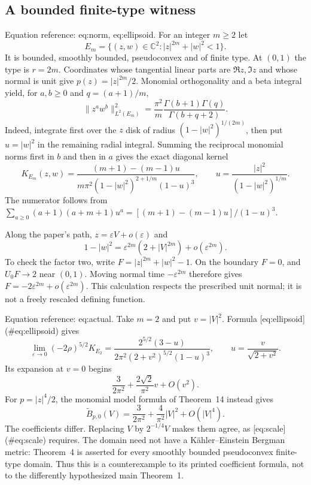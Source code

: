 \documentclass[10pt]{article}
\begin{document}
\subsection*{A bounded finite-type witness}
Equation reference: eq:norm, eq:ellipsoid. For an integer \(m\ge2\) let \[E_m=\{(z,w)\in\mathbb C^2:|z|^{2m}+|w|^2<1\}.\] It is bounded, smoothly bounded, pseudoconvex and of finite type. At \((0,1)\) the type is \(r=2m\). Coordinates whose tangential linear parts are \(\Re z,\Im z\) and whose normal is unit give \(p(z)=|z|^{2m}/2\). Monomial orthogonality and a beta integral yield, for \(a,b\ge0\) and \(q=(a+1)/m\), \[\|z^a w^b\|_{L^2(E_m)}^2
 =\frac{\pi^2}{m}
   \frac{\Gamma(b+1)\Gamma(q)}{\Gamma(b+q+2)}.
 \] Indeed, integrate first over the \(z\) disk of radius \((1-|w|^2)^{1/(2m)}\), then put \(u=|w|^2\) in the remaining radial integral. Summing the reciprocal monomial norms first in \(b\) and then in \(a\) gives the exact diagonal kernel \[K_{E_m}(z,w)=
 \frac{(m+1)-(m-1)u}
 {m\pi^2(1-|w|^2)^{2+1/m}(1-u)^3},
 \qquad
 u=\frac{|z|^2}{(1-|w|^2)^{1/m}}.
 \] The numerator follows from \(\sum_{a\ge0}(a+1)(a+m+1)u^a
=[(m+1)-(m-1)u]/(1-u)^3\).\par
Along the paper’s path, \(z=\varepsilon V+o(\varepsilon)\) and \[1-|w|^2=\varepsilon^{2m}(2+|V|^{2m})+o(\varepsilon^{2m}).\] To check the factor two, write \(F=|z|^{2m}+|w|^2-1\). On the boundary \(F=0\), and \(U_0F\to2\) near \((0,1)\). Moving normal time \(-\varepsilon^{2m}\) therefore gives \(F=-2\varepsilon^{2m}+o(\varepsilon^{2m})\). This calculation respects the prescribed unit normal; it is not a freely rescaled defining function.\par
Equation reference: eq:actual. Take \(m=2\) and put \(v=|V|^2\). Formula [eq:ellipsoid] (\#eq:ellipsoid) gives \[\lim_{\varepsilon\to0}(-2\rho)^{5/2}K_{E_2}
 =\frac{2^{5/2}(3-u)}
 {2\pi^2(2+v^2)^{5/2}(1-u)^3},
 \qquad u=\frac{v}{\sqrt{2+v^2}}.
 \] Its expansion at \(v=0\) begins \[\frac{3}{2\pi^2}+\frac{2\sqrt2}{\pi^2}v+O(v^2).\] For \(p=|z|^4/2\), the monomial model formula of Theorem 14 instead gives \[\widetilde B_{p,0}(V)=
 \frac{3}{2\pi^2}+\frac4{\pi^2}|V|^2+O(|V|^4).\] The coefficients differ. Replacing \(V\) by \(2^{-1/4}V\) makes them agree, as [eq:scale] (\#eq:scale) requires. The domain need not have a Kähler–Einstein Bergman metric: Theorem 4 is asserted for every smoothly bounded pseudoconvex finite-type domain. Thus this is a counterexample to its printed coefficient formula, not to the differently hypothesized main Theorem 1.\par
\end{document}
